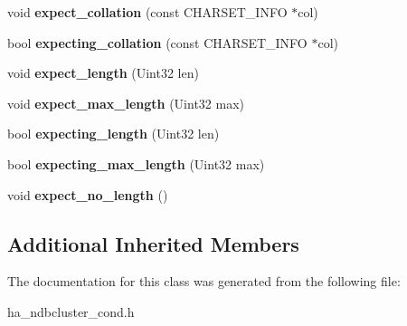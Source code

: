 \begin{DoxyCompactItemize}
void {\bfseries expect\+\_\+collation} (const C\+H\+A\+R\+S\+E\+T\+\_\+\+I\+N\+FO $\ast$col)
\item 
\mbox{\label{classNdb__expect__stack_a834b0b3f95487766c770e725a06fb0e7}} 
bool {\bfseries expecting\+\_\+collation} (const C\+H\+A\+R\+S\+E\+T\+\_\+\+I\+N\+FO $\ast$col)
\item 
\mbox{\label{classNdb__expect__stack_a8e43f0f63b724430e1c5df7bf5401753}} 
void {\bfseries expect\+\_\+length} (Uint32 len)
\item 
\mbox{\label{classNdb__expect__stack_a6a6abd5c1d54ba7ee2217731f3ac1a25}} 
void {\bfseries expect\+\_\+max\+\_\+length} (Uint32 max)
\item 
\mbox{\label{classNdb__expect__stack_aa8b3030fbe90f4d75cee4cc76a932bee}} 
bool {\bfseries expecting\+\_\+length} (Uint32 len)
\item 
\mbox{\label{classNdb__expect__stack_a811291697d2f7af3b0e3ed63a3f11274}} 
bool {\bfseries expecting\+\_\+max\+\_\+length} (Uint32 max)
\item 
\mbox{\label{classNdb__expect__stack_ad4706f775a49f8125449af2b4b3b1007}} 
void {\bfseries expect\+\_\+no\+\_\+length} ()
\end{DoxyCompactItemize}
\subsection*{Additional Inherited Members}


The documentation for this class was generated from the following file\+:\begin{DoxyCompactItemize}
\item 
ha\+\_\+ndbcluster\+\_\+cond.\+h\end{DoxyCompactItemize}

